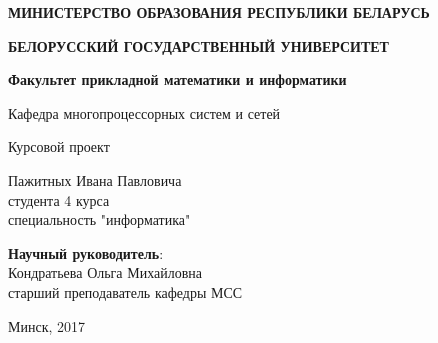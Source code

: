 \begin{titlepage}
    \begin{center}
         \textbf{МИНИСТЕРСТВО ОБРАЗОВАНИЯ РЕСПУБЛИКИ БЕЛАРУСЬ}
    \end{center}
    \begin{center}
         \textbf{БЕЛОРУССКИЙ ГОСУДАРСТВЕННЫЙ УНИВЕРСИТЕТ}
    \end{center}
    \begin{center}
         \textbf{Факультет прикладной математики и информатики}
    \end{center}
    \begin{center}
        Кафедра многопроцессорных систем и сетей
    \end{center}

    \vspace{9em}

    \begin{center}
        \textbf{\@jobtitle}
    \end{center}

    \vspace{2em}

    \begin{center}
        Курсовой проект
    \end{center}

    \vspace{4em}

    \begin{flushright}
        Пажитных Ивана Павловича\\
        студента 4 курса\\
        специальность "информатика"\\
    \end{flushright}

    \vspace{1em}

    \begin{flushright}
         \textbf{Научный руководитель}:\\
        Кондратьева Ольга Михайловна\\
        старший преподаватель кафедры МСС\\
    \end{flushright}

    \vfill

    \begin{center}
        Минск, 2017
    \end{center}
\end{titlepage}
\newpage
